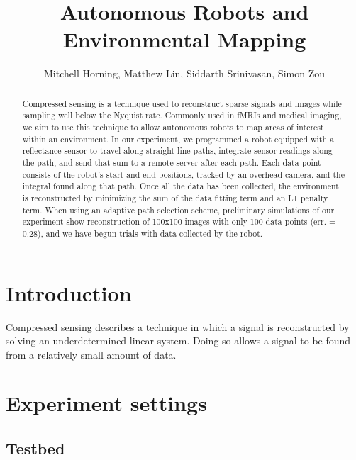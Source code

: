 \documentclass[english]{article}\usepackage[]{graphicx}\usepackage[]{color}
\begin{document}
\title{Autonomous Robots and Environmental Mapping}

\author{Mitchell Horning, Matthew Lin, Siddarth Srinivasan, Simon Zou}

\maketitle

\begin{abstract}

Compressed sensing is a technique used to reconstruct sparse signals and images while sampling well below the Nyquist rate. Commonly used in fMRIs and medical imaging, we aim to use this technique to allow autonomous robots to map areas of interest within an environment. In our experiment, we programmed a robot equipped with a reflectance sensor to travel along straight-line paths, integrate sensor readings along the path, and send that sum to a remote server after each path. Each data point consists of the robot's start and end positions, tracked by an overhead camera, and the integral found along that path. Once all the data has been collected, the environment is reconstructed by minimizing the sum of the data fitting term and an L1 penalty term. When using an adaptive path selection scheme, preliminary simulations of our experiment show reconstruction of 100x100 images with only 100 data points (err. = 0.28), and we have begun trials with data collected by the robot.

\end{abstract}

\tableofcontents

\section{Introduction}

\begin{comment}
Discuss Compressed Sensing

\end{comment}

Compressed sensing describes a technique in which a signal is reconstructed by 
solving an underdetermined linear system. Doing so allows a signal to be 
found from a relatively small amount of data.

\section{Experiment settings}
\subsection{Testbed}
\end{document}
